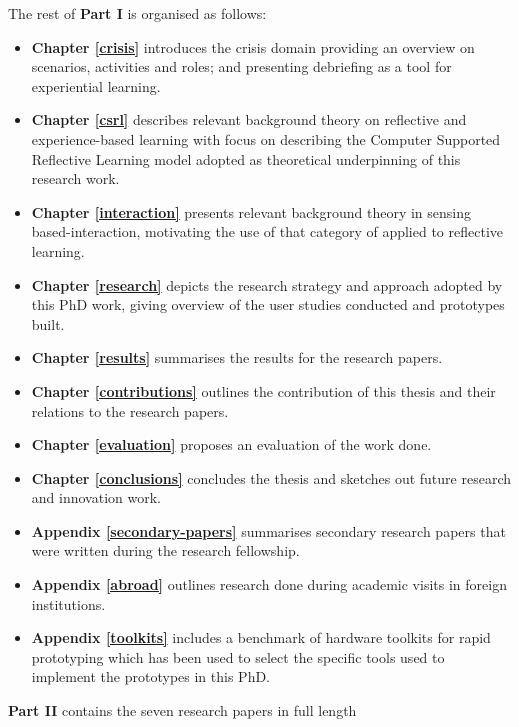 The rest of \textbf{Part I} is organised as follows:

\begin{itemize}
	\item \textbf{Chapter \ref{crisis}} introduces the crisis domain providing an overview on scenarios, activities and roles; and presenting debriefing as a tool for experiential learning.

	\item \textbf{Chapter \ref{csrl}} describes relevant background theory on reflective and experience-based learning with focus on describing the Computer Supported Reflective Learning model adopted as theoretical underpinning of this research work.

	\item \textbf{Chapter \ref{interaction}} presents relevant background theory in sensing based-interaction, motivating the use of that category of applied to reflective learning.

	\item \textbf{Chapter \ref{research}} depicts the research strategy and approach adopted by this PhD work, giving overview of the user studies conducted and prototypes built.

	\item \textbf{Chapter \ref{results}} summarises the results for the research papers.

	\item \textbf{Chapter \ref{contributions}} outlines the contribution of this thesis and their relations to the research papers.

	\item \textbf{Chapter \ref{evaluation}} proposes an evaluation of the work done.

	\item \textbf{Chapter \ref{conclusions}} concludes the thesis and sketches out future research and innovation work.

	\item \textbf{Appendix \ref{secondary-papers}} summarises secondary research papers that were written during the research fellowship.

	\item \textbf{Appendix \ref{abroad}} outlines research done during academic visits in foreign institutions.

	\item \textbf{Appendix \ref{toolkits}} includes a benchmark of hardware toolkits for rapid prototyping which has been used to select the specific tools used to implement the prototypes in this PhD. 
\end{itemize}

\textbf{Part II} contains the seven research papers in full length

